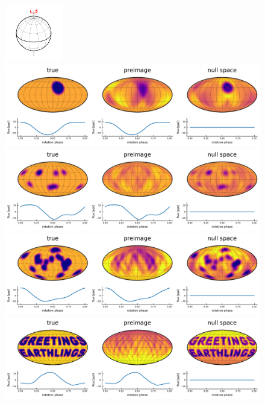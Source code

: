 \documentclass[modern,linenumbers]{aastex62}
\begin{document}
\begin{figure}[p!]
    \begin{centering}
        \vspace{-4em}
        \includegraphics[width=1in]{figures/wireframe_60.pdf}
        \\[0.5em]
        \includegraphics[width=\linewidth]{figures/nullspace_preimage_60a.pdf}
        \\[1em]
        \includegraphics[width=\linewidth]{figures/nullspace_preimage_60b.pdf}
        \\[1em]
        \includegraphics[width=\linewidth]{figures/nullspace_preimage_60c.pdf}
        \\[1em]
        \includegraphics[width=\linewidth]{figures/nullspace_preimage_60d.pdf}

\end{centering}
\end{figure}
\end{document}
